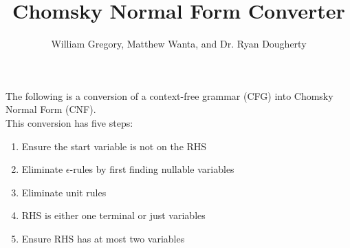 


\title{\textbf{Chomsky Normal Form Converter}}
\author{William Gregory, Matthew Wanta, and Dr. Ryan Dougherty}
\date{}
\maketitle
\thispagestyle{fancy}

The following is a conversion of a context-free grammar (CFG) into Chomsky Normal Form (CNF). \\

This conversion has five steps:
\begin{enumerate}
\item Ensure the start variable is not on the RHS
\item Eliminate $\epsilon$-rules by first finding nullable variables
\item Eliminate unit rules
\item RHS is either one terminal or just variables
\item Ensure RHS has at most two variables
\end{enumerate}
